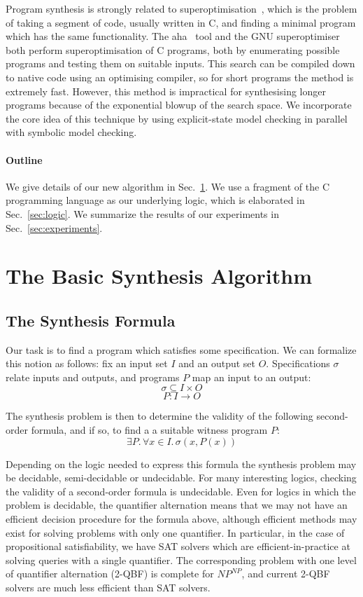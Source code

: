 \documentclass[a4paper]{llncs}
\begin{document}
Program synthesis is strongly related to
superoptimisation~\cite{superoptimisation}, which is the problem of taking a
segment of code, usually written in C, and finding a minimal program which
has the same functionality.  The {\sc aha}~\cite{aha} tool and the GNU
superoptimiser~\cite{gnu-superoptimiser} both perform superoptimisation of C
programs, both by enumerating possible programs and testing them on suitable
inputs.  This search can be compiled down to native code using an optimising
compiler, so for short programs the method is extremely fast.  However, this
method is impractical for synthesising longer programs because of the
exponential blowup of the search space.  We incorporate the core idea of
this technique by using explicit-state model checking in parallel with
symbolic model checking.

\paragraph{Outline} We give details of our new algorithm in
Sec.~\ref{sec:algorithm}.  We use a fragment of the C programming language
as our underlying logic, which is elaborated in Sec.~\ref{sec:logic}. We
summarize the results of our experiments in Sec.~\ref{sec:experiments}.



\section{The Basic Synthesis Algorithm}
\label{sec:algorithm}

\subsection{The Synthesis Formula}

Our task is to find a program which satisfies some specification.  We can formalize this
notion as follows: fix an input set $I$ and an output set $O$.  Specifications $\sigma$
relate inputs and outputs, and programs $P$ map an input to an output:
%
$$ \sigma \subseteq I \times O $$
$$ P : I \rightarrow O$$

The synthesis problem is then to determine the validity of the following
second-order formula, and if so, to find a a suitable witness program $P$:
%
$$\exists P .\, \forall x \in I.\, \sigma(x, P(x))$$

Depending on the logic needed to express this formula the synthesis problem
may be decidable, semi-decidable or undecidable.  For many interesting
logics, checking the validity of a second-order formula is undecidable. 
Even for logics in which the problem is decidable, the quantifier
alternation means that we may not have an efficient decision procedure for
the formula above, although efficient methods may exist for solving problems
with only one quantifier.  In particular, in the case of propositional
satisfiability, we have SAT solvers which are efficient-in-practice at
solving queries with a single quantifier.  The corresponding problem with
one level of quantifier alternation (2-QBF) is complete for $NP^{NP}$, and
current 2-QBF solvers are much less efficient than SAT solvers.
\end{document}
